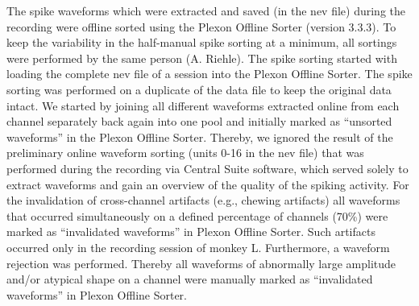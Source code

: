 {The spike waveforms which were extracted and saved (in the nev file) during the recording were offline sorted using the Plexon Offline Sorter (version 3.3.3). To keep the variability in the half-manual spike sorting at a minimum, all sortings were performed by the same person (A. Riehle). The spike sorting started with loading the complete nev file of a session into the Plexon Offline Sorter. The spike sorting was performed on a duplicate of the data file to keep the original data intact. We started by joining all different waveforms extracted online from each channel separately back again into one pool and initially marked as “unsorted waveforms” in the Plexon Offline Sorter. Thereby, we ignored the result of the preliminary online waveform sorting (units 0-16 in the nev file) that was performed during the recording via Central Suite software, which served solely to extract waveforms and gain an overview of the quality of the spiking activity. For the invalidation of cross-channel artifacts (e.g., chewing artifacts) all waveforms that occurred simultaneously on a defined percentage of channels (70\%) were marked as “invalidated waveforms” in Plexon Offline Sorter. Such artifacts occurred only in the recording session of monkey L. Furthermore, a waveform rejection was performed. Thereby all waveforms of abnormally large amplitude and/or atypical shape on a channel were manually marked as “invalidated waveforms” in Plexon Offline Sorter.

}
